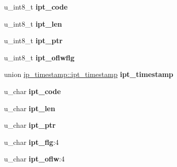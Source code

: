 \begin{DoxyCompactItemize}
\item 
\hypertarget{structip__timestamp_a644f149828dc6c49d25f54e9b380b88e}{
u\_\-int8\_\-t {\bfseries ipt\_\-code}}
\label{structip__timestamp_a644f149828dc6c49d25f54e9b380b88e}

\item 
\hypertarget{structip__timestamp_abe8d1bcc0a155e164b5944b033cffe18}{
u\_\-int8\_\-t {\bfseries ipt\_\-len}}
\label{structip__timestamp_abe8d1bcc0a155e164b5944b033cffe18}

\item 
\hypertarget{structip__timestamp_a6d14efb32ea96b435c2c36f63275e11d}{
u\_\-int8\_\-t {\bfseries ipt\_\-ptr}}
\label{structip__timestamp_a6d14efb32ea96b435c2c36f63275e11d}

\item 
\hypertarget{structip__timestamp_ac30c3161d0f5c4f429a2b5c77764ceca}{
u\_\-int8\_\-t {\bfseries ipt\_\-oflwflg}}
\label{structip__timestamp_ac30c3161d0f5c4f429a2b5c77764ceca}

\item 
\hypertarget{structip__timestamp_a4561e5033d5cbefaf9f656b45c7fb490}{
union \hyperlink{unionip__timestamp_1_1ipt__timestamp}{ip\_\-timestamp::ipt\_\-timestamp} {\bfseries ipt\_\-timestamp}}
\label{structip__timestamp_a4561e5033d5cbefaf9f656b45c7fb490}

\item 
\hypertarget{structip__timestamp_acef74409bb1cd69f42fd01ba477e84fd}{
u\_\-char {\bfseries ipt\_\-code}}
\label{structip__timestamp_acef74409bb1cd69f42fd01ba477e84fd}

\item 
\hypertarget{structip__timestamp_aaa11624ff6570272524d53d862437cc9}{
u\_\-char {\bfseries ipt\_\-len}}
\label{structip__timestamp_aaa11624ff6570272524d53d862437cc9}

\item 
\hypertarget{structip__timestamp_aa1f551b443486c3ff9637e3ba7c99b34}{
u\_\-char {\bfseries ipt\_\-ptr}}
\label{structip__timestamp_aa1f551b443486c3ff9637e3ba7c99b34}

\item 
\hypertarget{structip__timestamp_a07a852aa3d67f9369f358ce832b1b270}{
u\_\-char {\bfseries ipt\_\-flg}:4}
\label{structip__timestamp_a07a852aa3d67f9369f358ce832b1b270}

\item 
\hypertarget{structip__timestamp_af00cb31df56ab314a380f4b57a42af94}{
u\_\-char {\bfseries ipt\_\-oflw}:4}
\label{structip__timestamp_af00cb31df56ab314a380f4b57a42af94}

\end{DoxyCompactItemize}


